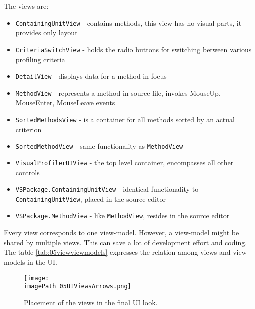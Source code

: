 The views are:
\begin{itemize}	
\item  \texttt{ContainingUnitView} - contains methods, this view has no visual parts, it provides only layout 

\item \texttt{CriteriaSwitchView} - holds the radio buttons for switching between various profiling criteria

\item \texttt{DetailView} - displays data for a method in focus

\item \texttt{MethodView} - represents a method in source file, invokes MouseUp, MouseEnter, MouseLeave events

\item \texttt{SortedMethodsView} - is a container for all methods sorted by an actual criterion

\item \texttt{SortedMethodView} - same functionality as \texttt{MethodView}

\item \texttt{VisualProfilerUIView} - the top level container, encompasses all other controls

\item \texttt{VSPackage.ContainingUnitView} - identical functionality to \texttt{ContainingUnitView}, placed in the source editor 

\item \texttt{VSPackage.MethodView} - like \texttt{MethodView}, resides in the source editor

\end{itemize}

Every view corresponds to one view-model. However, a view-model might be shared by multiple views. This can save a lot of development effort and coding. The table \ref{tab:05viewviewmodels} expresses the relation among views and view-models in the UI.

\begin{figure}
	\centering
		\texttt{[image: \\imagePath 05UIViewsArrows.png]}
		\caption{Placement of the views in the final UI look.}
	\label{fig:05UIViewsArrows}
\end{figure}

